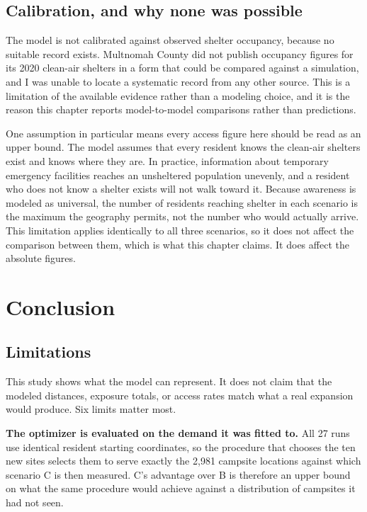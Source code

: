 \documentclass[graybox]{svmult}
\begin{document}
\subsection{Calibration, and why none was possible}
\label{sec:calibration}

The model is not calibrated against observed shelter occupancy, because no
suitable record exists. Multnomah County did not publish occupancy figures for
its 2020 clean-air shelters in a form that could be compared against a
simulation, and I was unable to locate a systematic record from any other source.
This is a limitation of the available evidence rather than a modeling choice, and
it is the reason this chapter reports model-to-model comparisons rather than
predictions.

One assumption in particular means every access figure here should be read as an
upper bound. The model assumes that every resident knows the clean-air shelters
exist and knows where they are. In practice, information about temporary
emergency facilities reaches an unsheltered population unevenly, and a resident
who does not know a shelter exists will not walk toward it. Because awareness is
modeled as universal, the number of residents reaching shelter in each scenario
is the maximum the geography permits, not the number who would actually arrive.
This limitation applies identically to all three scenarios, so it does not affect
the comparison between them, which is what this chapter claims. It does affect
the absolute figures.

\section{Conclusion}
\label{sec:conclusion}

\subsection{Limitations}
\label{sec:limitations}

This study shows what the model can represent. It does not claim that the modeled
distances, exposure totals, or access rates match what a real expansion would
produce. Six limits matter most.

\textbf{The optimizer is evaluated on the demand it was fitted to.} All 27 runs
use identical resident starting coordinates, so the procedure that chooses the
ten new sites selects them to serve exactly the 2,981 campsite locations against
which scenario C is then measured. C's advantage over B is therefore an upper
bound on what the same procedure would achieve against a distribution of
campsites it had not seen.
\end{document}

